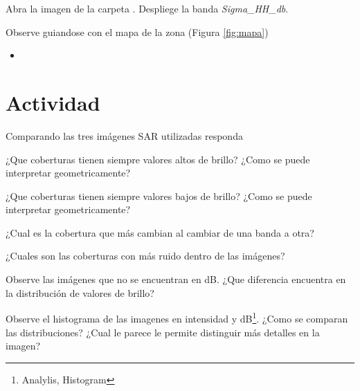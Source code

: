 Abra la imagen  de la carpeta . Despliege la banda \emph{Sigma\_HH_db}.

Observe guiandose con el mapa de la zona (Figura \ref{fig:mapa})
\begin{itemize}
    \item
\end{itemize}

\section{Actividad}

Comparando las tres imágenes SAR utilizadas responda

\begin{que}
    ¿Que coberturas tienen siempre valores altos de brillo? ¿Como se puede interpretar geometricamente?
\end{que}

\begin{que}
    ¿Que coberturas tienen siempre valores bajos de brillo? ¿Como se puede interpretar geometricamente?
\end{que}

\begin{que}
    ¿Cual es la cobertura que más cambian al cambiar de una banda a otra?
\end{que}

\begin{que}
    ¿Cuales son las coberturas con más ruido dentro de las imágenes?
\end{que}

\begin{que}
    Observe las imágenes que no se encuentran en dB. ¿Que diferencia encuentra en la distribución de valores de brillo?
\end{que}

\begin{que}
    Observe el histograma de las imagenes en intensidad y dB\footnote{Analylis, Histogram}. ¿Como se comparan las distribuciones? ¿Cual le parece le permite distinguir más detalles en la imagen?
\end{que}

